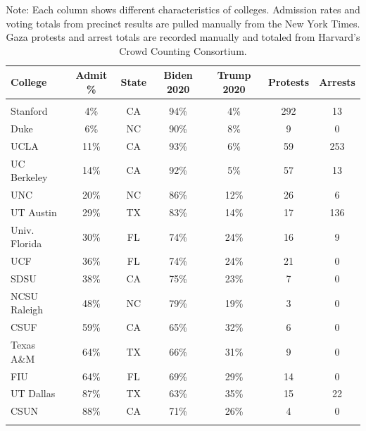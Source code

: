 \documentclass[12pt,letterpaper,oneside]{book}
\begin{document}
\begin{table}[h!]\centering
    \def\sym#1{\ifmmode^{#1}\else\(^{#1}\)\fi}
    \caption{Characteristics of Colleges in California, Texas, Florida, and North Carolina\label{tab:externalvalid}}
    \begin{tabular}{l*{1}{c c c c c c}}
        \hline\hline
        College  &  Admit \%  & State  & Biden 2020 & Trump 2020 &  Protests & Arrests \\
        \hline
        &&&&&&\\
        Stanford&4\%&CA&94\%&4\%&292&13\\
        Duke&6\%&    NC&    90\%&    8\%    &9&    0\\
        UCLA&11\%&    CA&    93\%&6\%    &59&    253\\
        UC Berkeley&14\%&    CA&    92\%&5\%    &57&    13\\
        UNC&20\%&    NC&    86\%&12\%    &26&    6\\
        UT Austin&29\%&    TX&    83\%&14\%    &17&    136\\
        Univ. Florida&30\%&    FL&    74\%&24\%    &16&    9\\
        UCF&36\%&    FL&    74\%&24\%    &21&    0\\
        SDSU&38\%&    CA&    75\%&23\%    &7&    0\\
        NCSU Raleigh&48\%&    NC&    79\%&19\%    &3&    0\\
        CSUF&59\%&    CA&    65\%&32\%    &6&    0\\
        Texas A\&M&64\%&    TX&    66\%&31\%    &9&    0\\
        FIU&64\%&    FL&    69\%&29\%    &14&    0\\
        UT Dallas&87\%&    TX&    63\%&35\%    &15&    22\\
        CSUN&88\%&    CA&    71\%&26\%    &4&    0\\
        &&&&&&\\
        \hline
    \end{tabular}
    \caption*{\footnotesize Note: Each column shows different characteristics of colleges. Admission rates and voting totals from precinct results are pulled manually from the New York Times. Gaza protests and arrest totals are recorded manually and totaled from Harvard’s Crowd Counting Consortium.}
\end{table}


\clearpage
\end{document}
